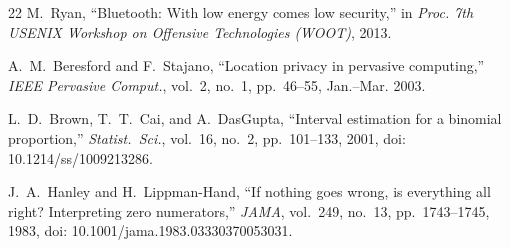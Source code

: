 \documentclass[journal,10pt]{IEEEtran}
\begin{document}
\begin{thebibliography}{22}
 M.~Ryan, ``Bluetooth: With low energy comes low security,'' in \emph{Proc. 7th USENIX Workshop on Offensive Technologies (WOOT)}, 2013.

 A.~M.~Beresford and F.~Stajano, ``Location privacy in pervasive computing,'' \emph{IEEE Pervasive Comput.}, vol.~2, no.~1, pp.~46--55, Jan.--Mar. 2003.

 L.~D.~Brown, T.~T.~Cai, and A.~DasGupta, ``Interval
estimation for a binomial proportion,'' \emph{Statist.\ Sci.}, vol.~16, no.~2,
pp.~101--133, 2001, doi: 10.1214/ss/1009213286.

 J.~A.~Hanley and H.~Lippman-Hand, ``If nothing
goes wrong, is everything all right? Interpreting zero numerators,'' \emph{JAMA},
vol.~249, no.~13, pp.~1743--1745, 1983, doi: 10.1001/jama.1983.03330370053031.

\end{thebibliography}
\end{document}
